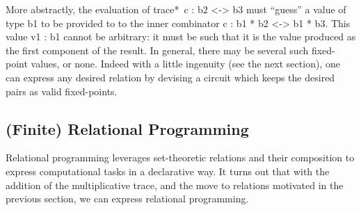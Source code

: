 \documentclass{llncs}
\begin{document}
More abstractly, the evaluation of {{trace*~c : b2 <-> b3}} must ``guess'' a
value of type {{b1}} to be provided to to the inner combinator 
{{c : b1 * b2 <-> b1 * b3}}. 
This value {{v1 : b1}} cannot be arbitrary: it must be such that it is the value
produced as the first component of the result.  In general, there may be
several such fixed-point values, or none. Indeed with a little ingenuity 
(see the next section), one can 
express any desired relation by devising a circuit which keeps the desired pairs as 
valid fixed-points. 







\subsection{(Finite) Relational Programming}
\label{ch3:sec:lp}

Relational programming leverages set-theoretic relations and their
composition to express computational tasks in a declarative way. 
It turns out that with the addition of the multiplicative trace, and
the move to relations motivated in the previous section, we can
express relational programming.
\end{document}
